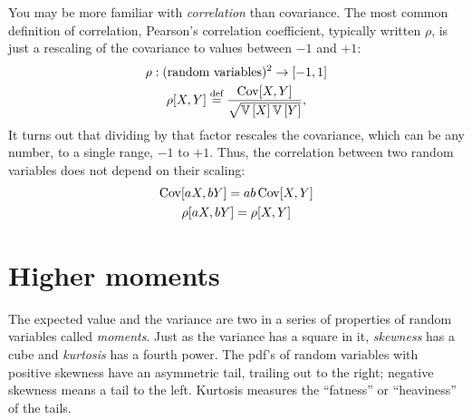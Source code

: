 You may be more familiar with \emph{correlation} than covariance. The most
common definition of correlation, Pearson's correlation coefficient, typically
written $\rho$, is just a rescaling of the covariance to values between $-1$
and $+1$:
\begin{gather*}
\rho : (\text{random variables})^2 \to [-1, 1] \\
\rho[X, Y] \stackrel{\text{def}}{=} \frac{\mathrm{Cov}\!\left[{X, Y}\right]}{\sqrt{\mathbb{V}\left[{X}\right] \mathbb{V}\left[{Y}\right]}},
\end{gather*}
It turns out that dividing by that factor rescales the covariance, which can
be any number, to a single range, $-1$ to $+1$. Thus, the correlation
between two random variables does not depend on their scaling:
\begin{gather*}
    \mathrm{Cov}\!\left[{aX, bY}\right] = ab \,\mathrm{Cov}\!\left[{X, Y}\right] \\
    \rho[aX, bY] = \rho[X, Y]
\end{gather*}

\section{Higher moments}

The expected value and the variance are two in a series of properties of
random variables called \emph{moments}. Just as the variance has a square in it,
\emph{skewness} has a cube and \emph{kurtosis} has a fourth power. The pdf's of random
variables with positive skewness have an asymmetric tail, trailing out to the right;
negative skewness means a tail to the left. Kurtosis measures the ``fatness''
or ``heaviness'' of the tails.

